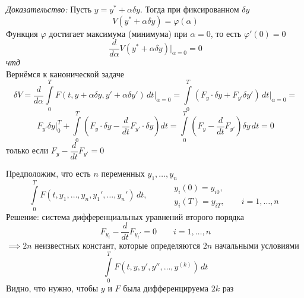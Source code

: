 \documentclass[a4paper,11pt]{article}
\begin{document}
\textit{Доказательство:} Пусть $y = y^* + \alpha\delta y$. Тогда при фиксированном $\delta y$
\[V(y^* + \alpha\delta y) = \varphi(\alpha)\]
Функция $\varphi$ достигает максимума (минимума) при $\alpha = 0$, то есть $\varphi'(0) = 0$
\[\frac{d}{d\alpha}V(y^* + \alpha\delta y)\Big|_{\alpha = 0} = 0\]
\textit{чтд}\\[5mm]

Вернёмся к канонической задаче
\[\delta V = \frac{d}{d\alpha}\int\limits_0^T F(t, y + \alpha \delta y, y' + \alpha\delta y')\, dt\Big|_{\alpha=0} = \int\limits_0^T(F_y\cdot\delta y + F_{y'}\delta y')\,dt\Big|_{\alpha=0} = \]
\[F_{y'}\delta y\Big|_0^T + \int\limits_0^T\left(F_y\cdot\delta y - \frac{d}{dt}F_{y'}\cdot\delta y\right)dt = \int\limits_0^T\left(F_y - \frac{d}{dt}F_{y'}\right)\delta y\,dt = 0\]
только если $F_y - \dfrac{d}{dt}F_{y'} = 0$

\newpage
{}
Предположим, что есть $n$ переменных $y_1,\dots,y_n$
\[\int\limits_0^TF\left(t, y_1, \dots, y_n, y_1', \dots, y_n'\right)\,dt,\qquad \begin{aligned}
    &y_i(0) = y_{i0},\\
    &y_i(T) = y_{iT},\qquad i = 1,\dots,n
\end{aligned}\]
Решение: система дифференциальных уравнений второго порядка
\[F_{y_i} - \frac{d}{dt}F_{y_i'} = 0 \qquad i = 1,\dots,n\]
$\implies 2n$ неизвестных констант, которые определяются $2n$ начальными условиями
\[\int\limits_0^T F\left(t, y, y', y'', \dots, y^{(k)}\right)\,dt\]
Видно, что нужно, чтобы $y$ и $F$ была дифференцируема $2k$ раз
\end{document}
